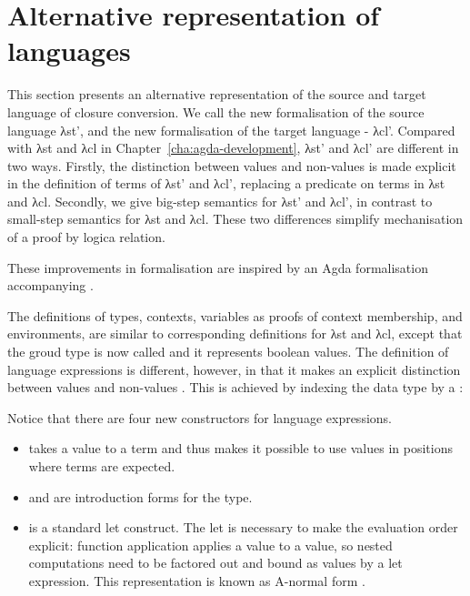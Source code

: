 \documentclass[bsc,frontabs,oneside,singlespacing,parskip,deptreport]{infthesis}
\theoremstyle{definition}
\theoremstyle{lemma}
\begin{document}
\section{Alternative representation of languages}
\label{sec:altern-form-interm}

This section presents an alternative representation of the source and
target language of closure conversion. We call the new formalisation
of the source language λst', and the new formalisation of the target
language - λcl'. Compared with λst and λcl in
Chapter~\ref{cha:agda-development}, λst' and λcl' are different in two
ways. Firstly, the distinction between values and non-values is made
explicit in the definition of terms of λst' and λcl', replacing a
predicate on terms in λst and λcl. Secondly, we give big-step
semantics for λst' and λcl', in contrast to small-step semantics for
λst and λcl. These two differences simplify mechanisation of a proof
by logica relation.

These improvements in formalisation are inspired by an Agda
formalisation accompanying \cite{DBLP:conf/cpp/McLaughlinMS18}.

The definitions of types, contexts, variables as proofs of context
membership, and environments, are similar to corresponding definitions
for λst and λcl, except that the groud type is now called  and
it represents boolean values. The definition of language expressions
is different, however, in that it makes an explicit distinction
between values  and non-values . This is achieved by
indexing the  data type by a :



Notice that there are four new constructors for language
expressions.

\begin{itemize}
\item {} takes a value  to a term  and thus
  makes it possible to use values in positions where terms are
  expected.
\item {} and  are introduction forms for the 
  type.
\item {} is a standard let construct. The let is necessary to
  make the evaluation order explicit: function application applies a
  value to a value, so nested computations need to be factored out and
  bound as values by a let expression. This representation is known as
  A-normal form \cite{DBLP:conf/lfp/SabryF92}.
\end{itemize}
\end{document}
